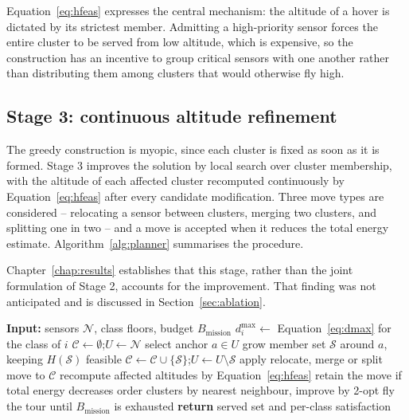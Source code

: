 Equation~\eqref{eq:hfeas} expresses the central mechanism: the altitude of a hover is dictated by its strictest member. Admitting a high-priority sensor forces the entire cluster to be served from low altitude, which is expensive, so the construction has an incentive to group critical sensors with one another rather than distributing them among clusters that would otherwise fly high.

\subsection{Stage 3: continuous altitude refinement}
\label{sec:method_refine}

The greedy construction is myopic, since each cluster is fixed as soon as it is formed. Stage 3 improves the solution by local search over cluster membership, with the altitude of each affected cluster recomputed continuously by Equation~\eqref{eq:hfeas} after every candidate modification. Three move types are considered -- relocating a sensor between clusters, merging two clusters, and splitting one in two -- and a move is accepted when it reduces the total energy estimate. Algorithm~\ref{alg:planner} summarises the procedure.

Chapter~\ref{chap:results} establishes that this stage, rather than the joint formulation of Stage 2, accounts for the improvement. That finding was not anticipated and is discussed in Section~\ref{sec:ablation}.

\begin{algorithm}[!ht]
\caption{Coupled placement with altitude refinement}
\label{alg:planner}
\begin{algorithmic}[1]
\State \textbf{Input:} sensors $\mathcal{N}$, class floors, budget $B_{\mathrm{mission}}$
  \State $d^{\max}_i \gets$ Equation~\eqref{eq:dmax} for the class of $i$
\EndFor
\State $\mathcal{C} \gets \emptyset$;\quad $U \gets \mathcal{N}$
  
  \State select anchor $a \in U$
  \State grow member set $\mathcal{S}$ around $a$, keeping $H(\mathcal{S})$ feasible
  \State $\mathcal{C} \gets \mathcal{C} \cup \{\mathcal{S}\}$;\quad $U \gets U \setminus \mathcal{S}$
\EndWhile
\Repeat  {}
  \State apply relocate, merge or split move to $\mathcal{C}$
  \State recompute affected altitudes by Equation~\eqref{eq:hfeas}
  \State retain the move if total energy decreases
\State order clusters by nearest neighbour, improve by 2-opt 
\State fly the tour until $B_{\mathrm{mission}}$ is exhausted
\State \textbf{return} served set and per-class satisfaction
\end{algorithmic}
\end{algorithm}

